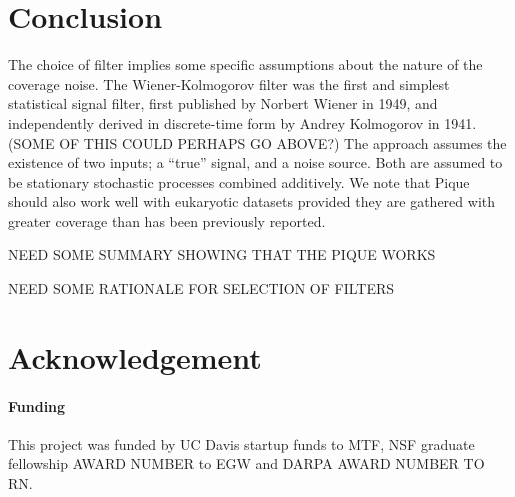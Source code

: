 \documentclass{bioinfo}
\begin{document}
\section{Conclusion}

The choice of filter implies some specific assumptions about the
nature of the coverage noise. The Wiener-Kolmogorov filter was the
first and simplest statistical signal filter, first published by
Norbert Wiener in 1949, and independently derived in discrete-time
form by Andrey Kolmogorov in 1941. (SOME OF THIS COULD PERHAPS GO
ABOVE?) The approach assumes the existence of two inputs; a ``true''
signal, and a noise source. Both are assumed to be stationary
stochastic processes combined additively. We note that Pique should
also work well with eukaryotic datasets provided they are gathered
with greater coverage than has been previously reported.

NEED SOME SUMMARY SHOWING THAT THE PIQUE WORKS

NEED SOME RATIONALE FOR SELECTION OF FILTERS

\section*{Acknowledgement}
\paragraph{Funding\textcolon} 

This project was funded by UC Davis startup funds to MTF, NSF graduate
fellowship AWARD NUMBER to EGW and DARPA AWARD NUMBER TO RN.

%
%
%
%





\end{document}
